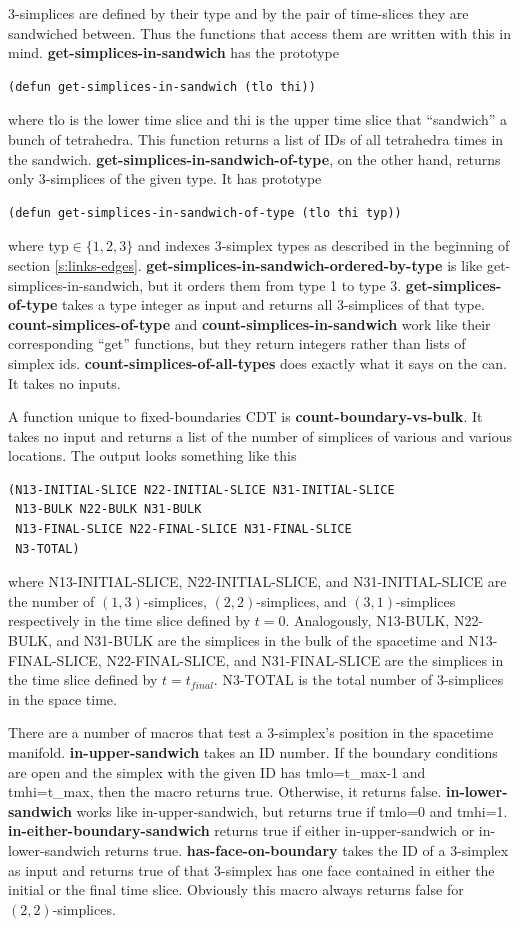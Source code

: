 \documentclass[12pt]{article}
\begin{document}
3-simplices are defined by their type and by the pair of time-slices
they are sandwiched between. Thus the functions that access them are
written with this in mind. \textbf{get-simplices-in-sandwich} has the
prototype
\begin{lstlisting}
(defun get-simplices-in-sandwich (tlo thi))
\end{lstlisting}
where tlo is the lower time slice and thi is the upper time slice that
``sandwich'' a bunch of tetrahedra. This function returns a list of IDs of
all tetrahedra times in the
sandwich. \textbf{get-simplices-in-sandwich-of-type}, on the other
hand, returns only 3-simplices of the given type. It has prototype
\begin{lstlisting}
(defun get-simplices-in-sandwich-of-type (tlo thi typ))
\end{lstlisting}
where typ$\in\{1,2,3\}$ and indexes 3-simplex types as described in
the beginning of section
\ref{s:links-edges}. \textbf{get-simplices-in-sandwich-ordered-by-type}
is like get-simplices-in-sandwich, but it orders them from type 1 to
type 3. \textbf{get-simplices-of-type} takes a type integer as input
and returns all 3-simplices of that
type. \textbf{count-simplices-of-type} and
\textbf{count-simplices-in-sandwich} work like their corresponding
``get'' functions, but they return integers rather than lists of
simplex ids. \textbf{count-simplices-of-all-types} does exactly what
it says on the can. It takes no inputs.

A function unique to fixed-boundaries CDT is
\textbf{count-boundary-vs-bulk}. It takes no input and returns a list
of the number of simplices of various and various locations. The
output looks something like this
\begin{lstlisting}
(N13-INITIAL-SLICE N22-INITIAL-SLICE N31-INITIAL-SLICE
 N13-BULK N22-BULK N31-BULK
 N13-FINAL-SLICE N22-FINAL-SLICE N31-FINAL-SLICE
 N3-TOTAL)
\end{lstlisting}
where N13-INITIAL-SLICE, N22-INITIAL-SLICE, and N31-INITIAL-SLICE are
the number of $(1,3)$-simplices, $(2,2)$-simplices, and
$(3,1)$-simplices respectively in the time slice defined by
$t=0$. Analogously, N13-BULK, N22-BULK, and N31-BULK are the simplices
in the bulk of the spacetime and N13-FINAL-SLICE, N22-FINAL-SLICE, and
N31-FINAL-SLICE are the simplices in the time slice defined by
$t=t_{final}$. N3-TOTAL is the total number of 3-simplices in the
space time.

There are a number of macros that test a 3-simplex's position in the
spacetime manifold. \textbf{in-upper-sandwich} takes an ID number. If
the boundary conditions are open and the simplex with the given ID has
tmlo=t\_max-1 and tmhi=t\_max, then the macro returns true. Otherwise,
it returns false. \textbf{in-lower-sandwich} works like
in-upper-sandwich, but returns true if tmlo=0 and
tmhi=1. \textbf{in-either-boundary-sandwich} returns true if either
in-upper-sandwich or in-lower-sandwich returns
true. \textbf{has-face-on-boundary} takes the ID of a 3-simplex as
input and returns true of that 3-simplex has one face contained in
either the initial or the final time slice. Obviously this macro
always returns false for $(2,2)$-simplices.
\end{document}
